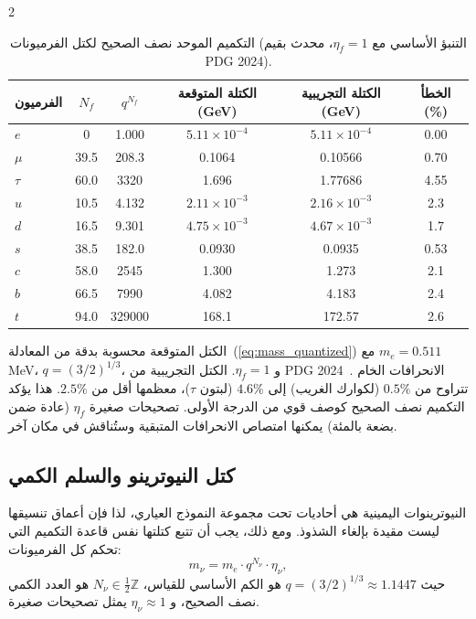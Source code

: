 \documentclass[11pt,a4paper]{article}
\begin{document}
\begin{multicols}{2}
		\begin{table}[H]
			\centering
			\caption{التكميم الموحد نصف الصحيح لكتل الفرميونات (التنبؤ الأساسي مع \(\eta_f=1\)، محدث بقيم PDG 2024).}
			\label{tab:fermions_new}
			\tiny  
			\begin{tabular}{l c c c c c}
				\toprule
				الفرميون & \(N_f\) & \(q^{N_f}\) & الكتلة المتوقعة (GeV) & الكتلة التجريبية (GeV) & الخطأ (\%) \\
				\midrule
				\(e\)   & 0      & 1.000 & \(5.11\times10^{-4}\) & \(5.11\times10^{-4}\) & 0.00 \\
				\(\mu\)  & 39.5   & 208.3 & 0.1064                & 0.10566              & 0.70 \\
				\(\tau\) & 60.0   & 3320  & 1.696                 & 1.77686              & 4.55 \\
				\(u\)   & 10.5   & 4.132 & \(2.11\times10^{-3}\)   & \(2.16\times10^{-3}\)  & 2.3 \\
				\(d\)   & 16.5   & 9.301 & \(4.75\times10^{-3}\)   & \(4.67\times10^{-3}\)  & 1.7 \\
				\(s\)   & 38.5   & 182.0 & 0.0930                & 0.0935               & 0.53 \\
				\(c\)   & 58.0   & 2545  & 1.300                 & 1.273                & 2.1 \\
				\(b\)   & 66.5   & 7990  & 4.082                 & 4.183                & 2.4 \\
				\(t\)   & 94.0   & 329000& 168.1                 & 172.57               & 2.6 \\
				\bottomrule
			\end{tabular}
			\par\smallskip
			\footnotesize 
			الكتل المتوقعة محسوبة بدقة من المعادلة~(\ref{eq:mass_quantized}) مع \(m_e = 0.511\) MeV، \(q = (3/2)^{1/3}\)، و \(\eta_f = 1\). 
			الكتل التجريبية من PDG 2024~\cite{PDG2024}. 
			الانحرافات الخام تتراوح من \(0.5\%\) (لكوارك الغريب) إلى \(4.6\%\) (لبتون \(\tau\))، معظمها أقل من \(2.5\%\). 
			هذا يؤكد التكميم نصف الصحيح كوصف قوي من الدرجة الأولى. 
			تصحيحات صغيرة \(\eta_f\) (عادة ضمن بضعة بالمئة) يمكنها امتصاص الانحرافات المتبقية وستُناقش في مكان آخر.
		\end{table}
		
		\subsection{كتل النيوترينو والسلم الكمي}
		
		النيوترينوات اليمينية هي أحاديات تحت مجموعة النموذج العياري، لذا فإن أعماق تنسيقها ليست مقيدة بإلغاء الشذوذ. ومع ذلك، يجب أن تتبع كتلتها نفس قاعدة التكميم التي تحكم كل الفرميونات:
		\begin{equation}
			m_\nu = m_e \cdot q^{N_\nu} \cdot \eta_\nu,
			\label{eq:neutrino_mass}
		\end{equation}
		حيث $q = (3/2)^{1/3} \approx 1.1447$ هو الكم الأساسي للقياس، $N_\nu \in \frac{1}{2}\mathbb{Z}$ هو العدد الكمي نصف الصحيح، و $\eta_\nu \approx 1$ يمثل تصحيحات صغيرة.
		

\end{multicols}
\end{document}
